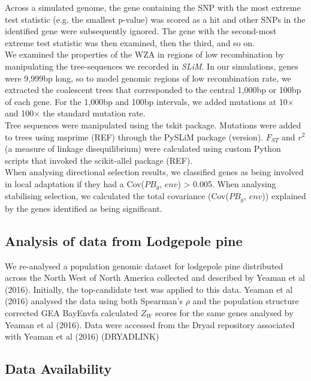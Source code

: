 \documentclass[11pt,twoside,lineno]{GSA_format}
\begin{document}
Across a simulated genome, the gene containing the SNP with the most extreme test statistic (e.g. the smallest p-value) was scored as a hit and other SNPs in the identified gene were subsequently ignored. The gene with the second-most extreme test statistic was then examined, then the third, and so on. \\


We examined the properties of the WZA in regions of low recombination by manipulating the tree-sequences we recorded in \textit{SLiM}. In our simulations, genes were 9,999bp long, so to model genomic regions of low recombination rate, we extracted the coalescent trees that corresponded to the central 1,000bp or 100bp of each gene. For the 1,000bp and 100bp intervals, we added mutations at 10$\times$ and 100$\times$ the standard mutation rate. \\

Tree sequences were manipulated using the tskit package. Mutations were added to trees using msprime (REF) through the PySLiM package (version). $F_{ST}$ and $r^2$ (a measure of linkage disequilibrium) were calculated using custom Python scripts that invoked the scikit-allel package (REF).\\




When analysing directional selection results, we classified genes as being involved in local adaptation if they had a Cov($PB_g$, $env$) > 0.005. When analysing stabilising selection, we calculated the total covariance (Cov($PB_g$, $env$)) explained by the genes identified as being significant.\\



\subsection{Analysis of data from Lodgepole pine}

We re-analysed a population genomic dataset for lodgepole pine distributed across the North West of North America collected and described by Yeaman et al (2016). Initially, the top-candidate test was applied to this data. Yeaman et al (2016) analysed the data using both Spearman's $\rho$ and the population structure corrected GEA BayEnvfa
calculated $Z_W$ scores for the same genes analysed by Yeaman et al (2016). Data were accessed from the Dryad repository associated with Yeaman et al (2016) (DRYADLINK)

\subsection{Data Availability}
\end{document}
